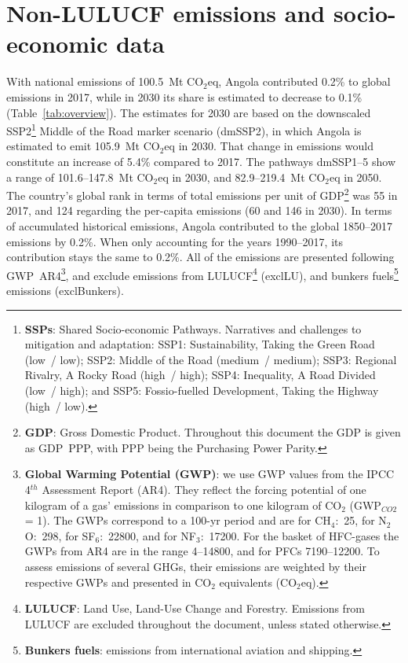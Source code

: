 \documentclass[12pt]{article}
\begin{document}
 \section{Non-LULUCF emissions and socio-economic data}
 \label{sec:nonLULUCFSocioEco}
 With national emissions of 100.5~Mt CO$_2$eq, Angola contributed 0.2\% to global emissions in 2017, while in 2030 its share is estimated to decrease to 0.1\% (Table~\ref{tab:overview}).
 The estimates for 2030 are based on the downscaled SSP2\footnote{\textbf{SSPs}: Shared Socio-economic Pathways.
 Narratives and challenges to mitigation and adaptation: 
 SSP1: Sustainability, Taking the Green Road (low~/ low);
 SSP2: Middle of the Road (medium~/ medium);
 SSP3: Regional Rivalry, A Rocky Road (high~/ high);
 SSP4: Inequality, A Road Divided (low~/ high); and
 SSP5: Fossio-fuelled Development, Taking the Highway (high~/ low).} Middle of the Road marker scenario (dmSSP2), in which Angola is estimated to emit 105.9~Mt CO$_2$eq in 2030.
 That change in emissions would constitute an increase of 5.4\% compared to 2017. 
 The pathways dmSSP1--5 show a range of 101.6--147.8~Mt CO$_2$eq in 2030, and 82.9--219.4~Mt CO$_2$eq in 2050.
 The country's global rank in terms of total emissions per unit of GDP\footnote{\textbf{GDP}: Gross Domestic Product. 
 Throughout this document the GDP is given as GDP~PPP, with PPP being the Purchasing Power Parity.} was 55 in 2017, and 124 regarding the per-capita emissions (60 and 146 in 2030).
 In terms of accumulated historical emissions, Angola contributed to the global 1850--2017 emissions by 0.2\%. 
 When only accounting for the years 1990--2017, its contribution stays the same to 0.2\%.
 All of the emissions are presented following GWP~AR4\footnote{\textbf{Global Warming Potential (GWP)}: we use GWP values from the IPCC 4$^{th}$ Assessment Report (AR4). 
 They reflect the forcing potential of one kilogram of a gas' emissions in comparison to one kilogram of CO$_2$ (GWP$_{CO2}$ = 1). 
 The GWPs correspond to a 100-yr period and are for CH$_4$:~25, for N$_2$O:~298, for SF$_6$:~22800, and for NF$_3$:~17200. 
 For the basket of HFC-gases the GWPs from AR4 are in the range 4--14800, and for PFCs 7190--12200. 
 To assess emissions of several GHGs, their emissions are weighted by their respective GWPs and presented in CO$_2$ equivalents (CO$_2$eq).}, and exclude emissions from LULUCF\footnote{\textbf{LULUCF}: Land Use, Land-Use Change and Forestry. 
 Emissions from LULUCF are excluded throughout the document, unless stated otherwise.} (exclLU), and bunkers fuels\footnote{\textbf{Bunkers fuels}: emissions from international aviation and shipping.} emissions (exclBunkers).
\end{document}
